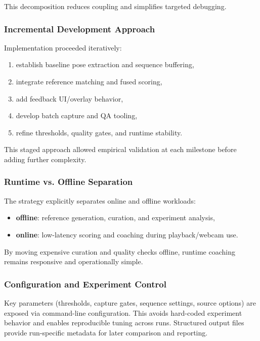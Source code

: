 \documentclass[12pt]{article}
\begin{document}
{This decomposition reduces coupling and simplifies targeted debugging.

\subsubsection{Incremental Development Approach}

Implementation proceeded iteratively:
\begin{enumerate}
    \item establish baseline pose extraction and sequence buffering,
    \item integrate reference matching and fused scoring,
    \item add feedback UI/overlay behavior,
    \item develop batch capture and QA tooling,
    \item refine thresholds, quality gates, and runtime stability.
\end{enumerate}

This staged approach allowed empirical validation at each milestone before adding further complexity.

\subsubsection{Runtime vs. Offline Separation}

The strategy explicitly separates online and offline workloads:

\begin{itemize}
    \item \textbf{offline}: reference generation, curation, and experiment analysis,
    \item \textbf{online}: low-latency scoring and coaching during playback/webcam use.
\end{itemize}

By moving expensive curation and quality checks offline, runtime coaching remains responsive and operationally simple.

\subsubsection{Configuration and Experiment Control}

Key parameters (thresholds, capture gates, sequence settings, source options) are exposed via command-line configuration. This avoids hard-coded experiment behavior and enables reproducible tuning across runs. Structured output files provide run-specific metadata for later comparison and reporting.

}
\end{document}
